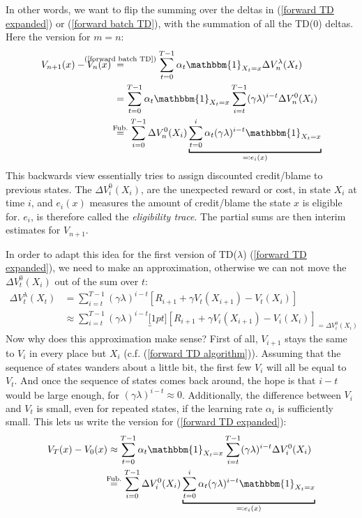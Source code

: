 In other words, we want to flip the summing over the deltas in (\ref{forward TD expanded}) or (\ref{forward batch TD}), with the summation of all the TD(\(0\)) deltas. Here the version for \(m=n\):
\begin{align*}
	V_{n+1}(x)-V_n(x)\;&\lxeq{\text{(\ref{forward batch TD})}} \sum_{t=0}^{T-1} \alpha_t \mathbbm{1}_{X_t=x}
	\Delta V^\lambda_n(X_t)\\
	&=\sum_{t=0}^{T-1} \alpha_t \mathbbm{1}_{X_t=x}
	\sum_{i=t}^{T-1}(\gamma\lambda)^{i-t} \Delta V^0_n(X_i)\\
	&\lxeq{\text{Fub.}}\sum_{i=0}^{T-1} \Delta V^0_n(X_i) 
	\underbracket[1pt]{\sum_{t=0}^{i} \alpha_t (\gamma\lambda)^{i-t} \mathbbm{1}_{X_t=x}}_{
		\eqqcolon e_i(x)
	}
\end{align*}
This backwards view essentially tries to assign discounted credit/blame to previous states. The \(\Delta V^0_i(X_i)\), are the unexpected reward or cost, in state \(X_i\) at time \(i\), and \(e_i(x)\) measures the amount of credit/blame the state \(x\) is eligible for. \(e_i\), is therefore called the \emph{eligibility trace}. The partial sums are then interim estimates for \(V_{n+1}\). 

In order to adapt this idea for the first version of TD(\(\lambda\)) (\ref{forward TD expanded}), we need to make an approximation, otherwise we can not move the \(\Delta V^0_t(X_i)\) out of the sum over \(t\):
\begin{align}
	\Delta V_t^\lambda (X_t)&=\sum_{i=t}^{T-1}(\gamma\lambda)^{i-t} \left[
		R_{i+1} + \gamma V_t(X_{i+1}) - V_t(X_{i})
	\right]
	\nonumber \\
	&\approx \sum_{i=t}^{T-1}(\gamma\lambda)^{i-t} 
	\underbracket[1pt]{\left[
		R_{i+1} + \gamma V_i(X_{i+1}) - V_i(X_{i})
	\right]}_{
		=\Delta V^0_i(X_i)
	}\label{approx}
\end{align}
Now why does this approximation make sense? First of all, \(V_{i+1}\) stays the same to \(V_i\) in every place but \(X_i\) (c.f. (\ref{forward TD algorithm})). Assuming that the sequence of states wanders about a little bit, the first few \(V_i\) will all be equal to \(V_t\). And once the sequence of states comes back around, the hope is that \(i-t\) would be large enough, for \((\gamma\lambda)^{i-t}\approx 0\). Additionally, the difference between \(V_i\) and \(V_t\) is small, even for repeated states, if the learning rate \(\alpha_i\) is sufficiently small. 
This lets us write the version for (\ref{forward TD expanded}):
\begin{align*}
	V_T(x)-V_0(x)%
	&\approx \sum_{t=0}^{T-1} \alpha_t \mathbbm{1}_{X_t=x}
	\sum_{i=t}^{T-1}(\gamma\lambda)^{i-t} \Delta V^0_i(X_i)\\
	&\lxeq{\text{Fub.}}\sum_{i=0}^{T-1} \Delta V^0_i(X_i) 
	\underbracket[1pt]{\sum_{t=0}^{i} \alpha_t (\gamma\lambda)^{i-t} \mathbbm{1}_{X_t=x}}_{
		\eqqcolon e_i(x)
	}
\end{align*}


